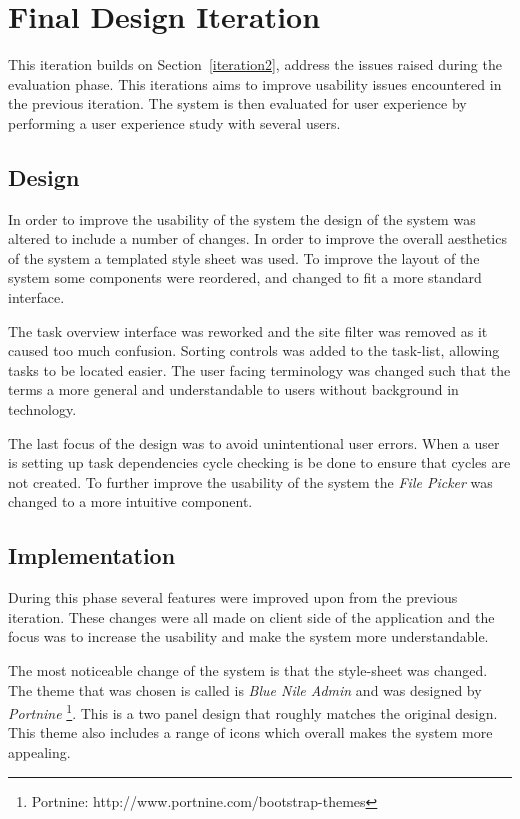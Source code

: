 \documentclass[12pt,a4paper]{report}
\begin{document}
\section{Final Design Iteration\label{iteration3}}
This iteration builds on Section~\ref{iteration2}, address the issues raised during the evaluation
phase. This iterations aims to improve usability issues encountered in the previous iteration. The
system is then evaluated for user experience by performing a user experience study with several users.
\subsection{Design}
In order to improve the usability of the system the design of the system was altered to include a
number of changes. In order to improve the overall aesthetics of the system a templated style sheet
was used. To improve the layout of the system some components were  reordered, and
changed to fit a more standard interface.

The task overview interface was reworked and the site filter was removed as it caused too
much confusion. Sorting controls was added to the task-list, allowing tasks to be located
easier. The user facing terminology was changed such that the terms a more general
and understandable to users without background in technology.

The last focus of the design was to avoid unintentional user errors. 
When a user is setting up task dependencies cycle checking is be done to ensure that cycles
are not created. To further improve the usability of the system the \emph{File
Picker} was changed to a more intuitive component.

\subsection{Implementation}

During this phase several features were improved upon from the previous iteration.
These changes were all made on client side of the application and the focus was
to increase the usability and make the system more understandable.

The most noticeable change of the system is that the style-sheet was changed. The theme that
was chosen is called is \emph{Blue Nile Admin} and was designed by \emph{Portnine}
\footnote{Portnine: http://www.portnine.com/bootstrap-themes}. This is a two panel design
that roughly matches the original design. This theme also includes a range of icons which
overall makes the system more appealing.
\end{document}
